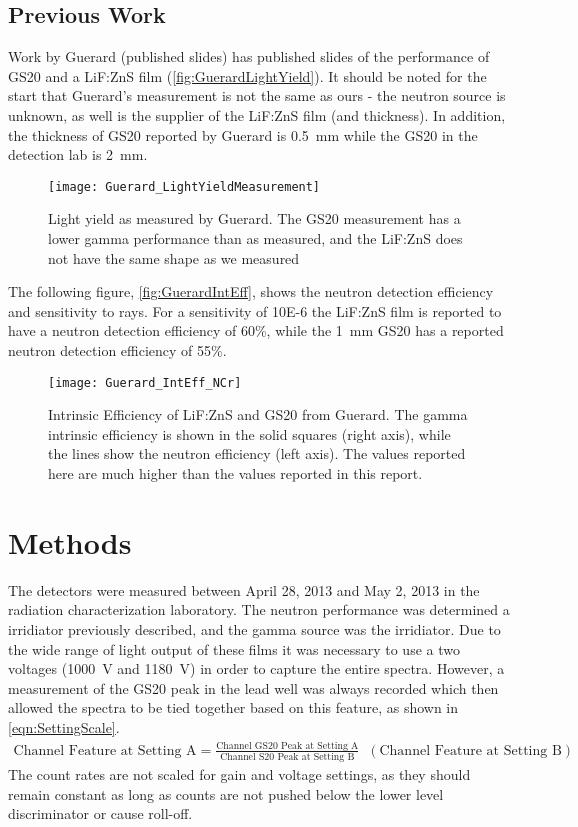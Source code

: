 \documentclass[draftcls,onecolumn]{IEEEtran}
\begin{document}
\subsection{Previous Work}

Work by Guerard (published slides) has published slides of the performance of GS20 and a LiF:ZnS film (\autoref{fig:GuerardLightYield}).
It should be noted for the start that Guerard's measurement is not the same as ours - the neutron source is unknown, as well is the supplier of the LiF:ZnS film (and thickness). 
In addition, the thickness of GS20 reported by Guerard is \SI{0.5}{\mm} while the GS20 in the detection lab is \SI{2}{\mm}.
\begin{figure}
  \centering
  \texttt{[image: Guerard\_LightYieldMeasurement]}
  \caption[Measured Light Yield (Guerard)]{Light yield as measured by Guerard. The GS20 measurement has a lower gamma performance than as measured, and the LiF:ZnS does not have the same shape as we measured}
	\label{fig:GuerardLightYield}
\end{figure}
The following figure, \autoref{fig:GuerardIntEff}, shows the neutron detection efficiency and sensitivity to  rays.
For a sensitivity of \num{10E-6} the LiF:ZnS film is reported to have a neutron detection efficiency of 60\%, while the \SI{1}{\mm} GS20 has a reported neutron detection efficiency of 55\%.
\begin{figure}
  \centering
  \texttt{[image: Guerard\_IntEff\_NCr]}
  \caption[Intrinsic Efficiency (Geurard)]{Intrinsic Efficiency of LiF:ZnS and GS20 from Guerard.  The gamma intrinsic efficiency is shown in the solid squares (right axis), while the lines show the neutron efficiency (left axis). The values reported here are much higher than the values reported in this report.}
	\label{fig:GuerardIntEff}
\end{figure}

\section{Methods}
The detectors were measured between April 28, 2013 and May 2, 2013 in the radiation characterization laboratory.
The neutron performance was determined a  irridiator previously described, and the gamma source was the  irridiator.
Due to the wide range of light output of these films it was necessary to use a two voltages (\SI{1000}{\volt} and \SI{1180}{\volt}) in order to capture the entire spectra.
However, a measurement of the GS20 peak in the lead well was always recorded which then allowed the spectra to be tied together based on this feature, as shown in \autoref{eqn:SettingScale}.
\begin{align}
  \label{eqn:SettingScale}
  \text{Channel Feature at Setting A} = \frac{\text{Channel GS20 Peak at Setting A}}{\text{Channel S20 Peak at Setting B}} \;\; \left( \text{Channel Feature at Setting B}\right)
\end{align}
The count rates are not scaled for gain and voltage settings, as they should remain constant as long as counts are not pushed below the lower level discriminator or cause roll-off.
\end{document}
